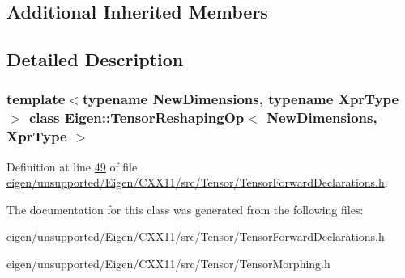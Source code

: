 \subsection*{Additional Inherited Members}


\subsection{Detailed Description}
\subsubsection*{template$<$typename New\+Dimensions, typename Xpr\+Type$>$\newline
class Eigen\+::\+Tensor\+Reshaping\+Op$<$ New\+Dimensions, Xpr\+Type $>$}



Definition at line \hyperlink{eigen_2unsupported_2_eigen_2_c_x_x11_2src_2_tensor_2_tensor_forward_declarations_8h_source_l00049}{49} of file \hyperlink{eigen_2unsupported_2_eigen_2_c_x_x11_2src_2_tensor_2_tensor_forward_declarations_8h_source}{eigen/unsupported/\+Eigen/\+C\+X\+X11/src/\+Tensor/\+Tensor\+Forward\+Declarations.\+h}.



The documentation for this class was generated from the following files\+:\begin{DoxyCompactItemize}
\item 
eigen/unsupported/\+Eigen/\+C\+X\+X11/src/\+Tensor/\+Tensor\+Forward\+Declarations.\+h\item 
eigen/unsupported/\+Eigen/\+C\+X\+X11/src/\+Tensor/\+Tensor\+Morphing.\+h\end{DoxyCompactItemize}
